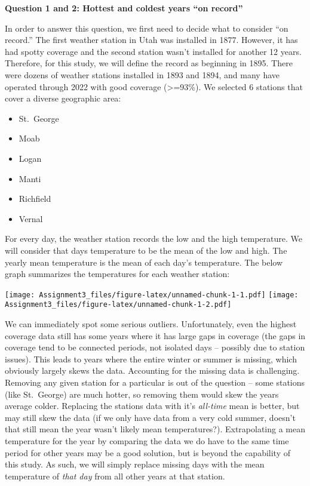 \documentclass[
]{article}
\providecommand{\tightlist}{%
  \setlength{\itemsep}{0pt}\setlength{\parskip}{0pt}}
\begin{document}
\textbf{Question 1 and 2: Hottest and coldest years ``on record''}

In order to answer this question, we first need to decide what to
consider ``on record.'' The first weather station in Utah was installed
in 1877. However, it has had spotty coverage and the second station
wasn't installed for another 12 years. Therefore, for this study, we
will define the record as beginning in 1895. There were dozens of
weather stations installed in 1893 and 1894, and many have operated
through 2022 with good coverage (\textgreater=93\%). We selected 6
stations that cover a diverse geographic area:

\begin{itemize}
\tightlist
\item
  St.~George
\item
  Moab
\item
  Logan
\item
  Manti
\item
  Richfield
\item
  Vernal
\end{itemize}

For every day, the weather station records the low and the high
temperature. We will consider that days temperature to be the mean of
the low and high. The yearly mean temperature is the mean of each day's
temperature. The below graph summarizes the temperatures for each
weather station:

\texttt{[image: Assignment3\_files/figure-latex/unnamed-chunk-1-1.pdf]}
\texttt{[image: Assignment3\_files/figure-latex/unnamed-chunk-1-2.pdf]}

We can immediately spot some serious outliers. Unfortunately, even the
highest coverage data still has some years where it has large gaps in
coverage (the gaps in coverage tend to be connected periods, not
isolated days -- possibly due to station issues). This leads to years
where the entire winter or summer is missing, which obviously largely
skews the data. Accounting for the missing data is challenging. Removing
any given station for a particular is out of the question -- some
stations (like St.~George) are much hotter, so removing them would skew
the years average colder. Replacing the stations data with it's
\emph{all-time} mean is better, but may still skew the data (if we only
have data from a very cold summer, doesn't that still mean the year
wasn't likely mean temperatures?). Extrapolating a mean temperature for
the year by comparing the data we do have to the same time period for
other years may be a good solution, but is beyond the capability of this
study. As such, we will simply replace missing days with the mean
temperature of \emph{that day} from all other years at that station.
\end{document}
